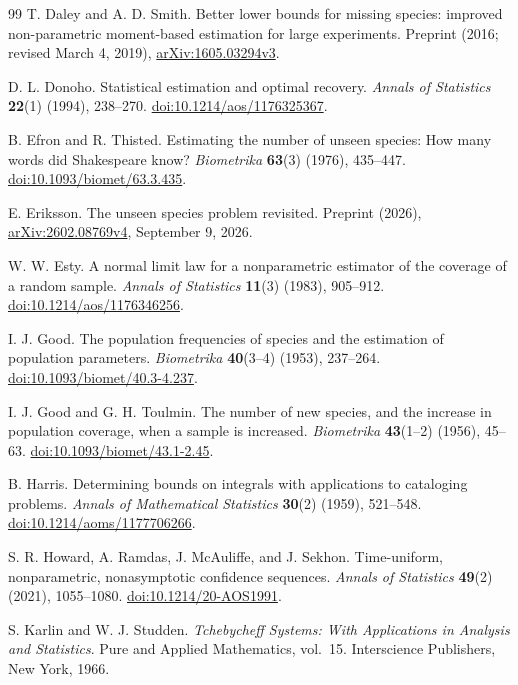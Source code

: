 \documentclass[11pt]{article}
\numberwithin{equation}{section}
\theoremstyle{definition}
\theoremstyle{remark}
\begin{document}
\begin{thebibliography}{99}
T. Daley and A. D. Smith.
Better lower bounds for missing species: improved non-parametric moment-based estimation for large experiments.
Preprint (2016; revised March 4, 2019), \href{https://arxiv.org/abs/1605.03294v3}{arXiv:1605.03294v3}.

D. L. Donoho.
Statistical estimation and optimal recovery.
\emph{Annals of Statistics} \textbf{22}(1) (1994), 238--270.
\href{https://doi.org/10.1214/aos/1176325367}{doi:10.1214/aos/1176325367}.

B. Efron and R. Thisted.
Estimating the number of unseen species: How many words did Shakespeare know?
\emph{Biometrika} \textbf{63}(3) (1976), 435--447.
\href{https://doi.org/10.1093/biomet/63.3.435}{doi:10.1093/biomet/63.3.435}.

E. Eriksson.
The unseen species problem revisited.
Preprint (2026), \href{https://arxiv.org/abs/2602.08769v4}{arXiv:2602.08769v4}, September 9, 2026.

W. W. Esty.
A normal limit law for a nonparametric estimator of the coverage of a random sample.
\emph{Annals of Statistics} \textbf{11}(3) (1983), 905--912.
\href{https://doi.org/10.1214/aos/1176346256}{doi:10.1214/aos/1176346256}.

I. J. Good.
The population frequencies of species and the estimation of population parameters.
\emph{Biometrika} \textbf{40}(3--4) (1953), 237--264.
\href{https://doi.org/10.1093/biomet/40.3-4.237}{doi:10.1093/biomet/40.3-4.237}.

I. J. Good and G. H. Toulmin.
The number of new species, and the increase in population coverage, when a sample is increased.
\emph{Biometrika} \textbf{43}(1--2) (1956), 45--63.
\href{https://doi.org/10.1093/biomet/43.1-2.45}{doi:10.1093/biomet/43.1-2.45}.

B. Harris.
Determining bounds on integrals with applications to cataloging problems.
\emph{Annals of Mathematical Statistics} \textbf{30}(2) (1959), 521--548.
\href{https://doi.org/10.1214/aoms/1177706266}{doi:10.1214/aoms/1177706266}.

S. R. Howard, A. Ramdas, J. McAuliffe, and J. Sekhon.
Time-uniform, nonparametric, nonasymptotic confidence sequences.
\emph{Annals of Statistics} \textbf{49}(2) (2021), 1055--1080.
\href{https://doi.org/10.1214/20-AOS1991}{doi:10.1214/20-AOS1991}.

S. Karlin and W. J. Studden.
\emph{Tchebycheff Systems: With Applications in Analysis and Statistics}.
Pure and Applied Mathematics, vol.~15. Interscience Publishers, New York, 1966.


\end{thebibliography}
\end{document}
